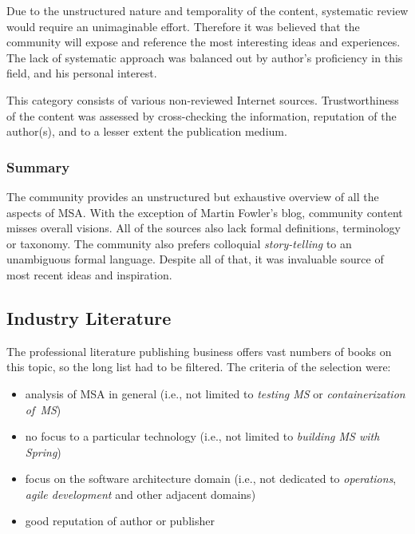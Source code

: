 \documentclass[thesis=M,english,hidelinks]{FITthesis}[2012/10/20]
\begin{document}
Due to the unstructured nature and temporality of the content, systematic review would require an unimaginable effort. Therefore it was believed that the community will expose and reference the most interesting ideas and experiences. The lack of systematic approach was balanced out by author's proficiency in this field, and his personal interest.

This category consists of various non-reviewed Internet sources. Trustworthiness of the content was assessed by cross-checking the information, reputation of the author(s), and to a lesser extent the publication medium.
\subsubsection*{Summary}
The community provides an unstructured but exhaustive overview of all the aspects of \acrshort{MSA}. With the exception of Martin Fowler's blog, community content misses overall visions. All of the sources also lack formal definitions, terminology or taxonomy. The community also prefers colloquial \textit{story-telling} to an unambiguous formal language. Despite all of that, it was invaluable source of most recent ideas and inspiration. 

\subsection{Industry Literature}
The professional literature publishing business offers vast numbers of books on this topic, so the long list had to be filtered. The criteria of the selection were:
\begin{itemize}
    \item analysis of \acrshort{MSA} in general (i.e., not limited to \textit{testing \acrshort{MS}} or \textit{containerization of~\acrshort{MS}})
    \item no focus to a particular technology (i.e., not limited to \textit{building \acrshort{MS} with Spring})
    \item focus on the software architecture domain (i.e., not dedicated to \textit{operations}, \textit{agile development} and other adjacent domains)
    \item good reputation of author or publisher
\end{itemize}
\end{document}
